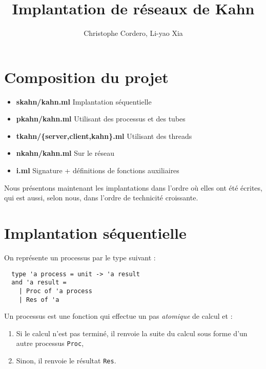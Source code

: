 \documentclass[11pt]{article}
\begin{document}
\title{Implantation de r\'eseaux de Kahn}

\author{Christophe Cordero, Li-yao Xia}

\maketitle

\section{Composition du projet}

\begin{itemize}
  \item {\bf skahn/kahn.ml} Implantation s\'equentielle
  \item {\bf pkahn/kahn.ml} Utilisant des processus et des tubes
  \item {\bf tkahn/\{server,client,kahn\}.ml} Utilisant des threads
  \item {\bf nkahn/kahn.ml} Sur le r\'eseau
  \item {\bf i.ml} Signature + d\'efinitions de fonctions auxiliaires
\end{itemize}

\smallskip

Nous pr\'esentons maintenant les implantations dans l'ordre
o\`u elles ont \'et\'e \'ecrites, qui est aussi, selon nous, dans l'ordre de technicit\'e croissante.

\section{Implantation s\'equentielle}

On repr\'esente un processus par le type suivant :

\begin{lstlisting}
  type 'a process = unit -> 'a result
  and 'a result =
    | Proc of 'a process
    | Res of 'a
\end{lstlisting}

Un processus est une fonction qui effectue
un pas {\em atomique} de calcul et :

\begin{enumerate}
  \item Si le calcul n'est pas termin\'e,
    il renvoie la suite du calcul sous forme d'un autre processus {\tt Proc},
  \item Sinon, il renvoie le r\'esultat {\tt Res}.
\end{enumerate}
\end{document}
